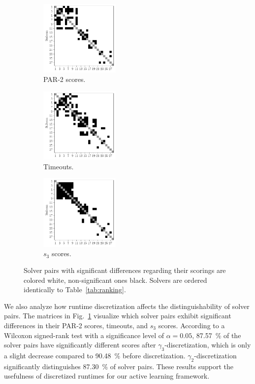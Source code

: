 \documentclass[sn-basic, Numbered]{sn-jnl} %
\begin{document}
\begin{figure}[tb]
	\centering
	\begin{subfigure}{0.32\textwidth}
		\centering
		\includegraphics[width=3.9cm]{plots/par2sigdiff.pdf}
		\caption{PAR-2 scores.}
	\end{subfigure}
	\begin{subfigure}{0.32\textwidth}
		\centering
		\includegraphics[width=3.9cm]{plots/timeoutsigdiff.pdf}
		\caption{Timeouts.}
	\end{subfigure}
	\begin{subfigure}{0.32\textwidth}
		\centering
		\includegraphics[width=3.9cm]{plots/s3sigdiff.pdf}
		\caption{$s_3$ scores.}
	\end{subfigure}
	\caption{Solver pairs with significant differences regarding their scorings are colored white, non-significant ones black. Solvers are ordered identically to Table~\ref{tab:ranking}.}
	\label{fig:solver-confusion-matrices}
\end{figure}

We also analyze how runtime discretization affects the distinguishability of solver pairs.
The matrices in Fig.~\ref{fig:solver-confusion-matrices} visualize which solver pairs exhibit significant differences in their PAR-2 scores, timeouts, and $s_3$ scores.
According to a Wilcoxon signed-rank test with a significance level of $\alpha = 0.05$, \SI{87.57}{\%} of the solver pairs have significantly different scores after $\gamma_3$-discretization, which is only a slight decrease compared to \SI{90.48}{\%} before discretization.
$\gamma_2$-discretization significantly distinguishes \SI{87.30}{\%} of solver pairs.
These results support the usefulness of discretized runtimes for our active learning framework.
\end{document}
